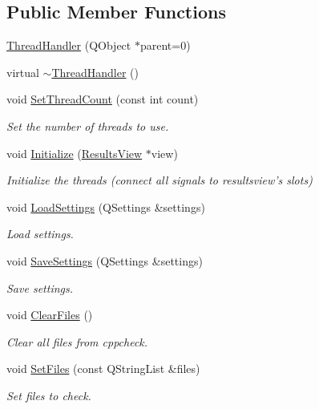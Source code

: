 \subsection*{Public Member Functions}
\begin{DoxyCompactItemize}
\item 
\hyperlink{class_thread_handler_a91f8b72791c029d7cd5e2c0e4dab4b36}{Thread\-Handler} (Q\-Object $\ast$parent=0)
\item 
virtual \hyperlink{class_thread_handler_aa8c0bc9cc64189e5dfd7524a903ec176}{$\sim$\-Thread\-Handler} ()
\item 
void \hyperlink{class_thread_handler_a1f4af444c9410cd7101e783d10b57fac}{Set\-Thread\-Count} (const int count)
\begin{DoxyCompactList}\small\item\em Set the number of threads to use. \end{DoxyCompactList}\item 
void \hyperlink{class_thread_handler_a646cf240ab9545ac0681ce107c8cc35f}{Initialize} (\hyperlink{class_results_view}{Results\-View} $\ast$view)
\begin{DoxyCompactList}\small\item\em Initialize the threads (connect all signals to resultsview's slots) \end{DoxyCompactList}\item 
void \hyperlink{class_thread_handler_ae7914463cf34caf6792f12a6b14677b3}{Load\-Settings} (Q\-Settings \&settings)
\begin{DoxyCompactList}\small\item\em Load settings. \end{DoxyCompactList}\item 
void \hyperlink{class_thread_handler_a5bff11d85c1f450bc7183b3ffbae4d3e}{Save\-Settings} (Q\-Settings \&settings)
\begin{DoxyCompactList}\small\item\em Save settings. \end{DoxyCompactList}\item 
void \hyperlink{class_thread_handler_addaa3888c5a6a11f0cc38c6f42084679}{Clear\-Files} ()
\begin{DoxyCompactList}\small\item\em Clear all files from cppcheck. \end{DoxyCompactList}\item 
void \hyperlink{class_thread_handler_aa298024c0b56f111052829ee839d6691}{Set\-Files} (const Q\-String\-List \&files)
\begin{DoxyCompactList}\small\item\em Set files to check. \end{DoxyCompactList}\item 

\end{DoxyCompactItemize}
